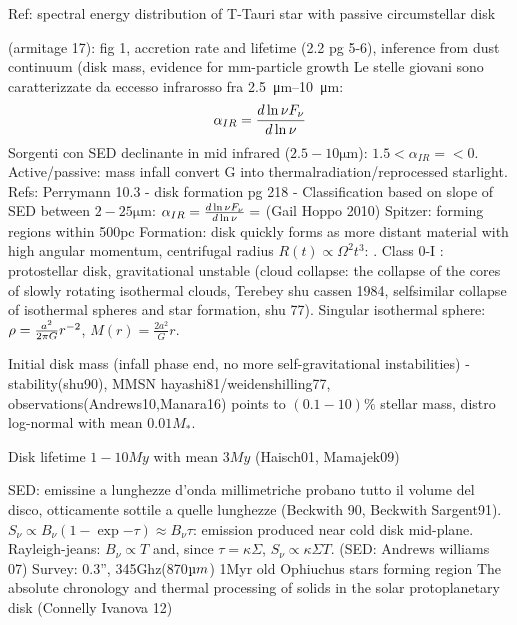 \begin{workout}
	Ref: spectral energy distribution of T-Tauri star with passive circumstellar disk
\end{workout}

\begin{workout}
	(armitage 17): fig 1, accretion rate and lifetime (2.2 pg 5-6), inference from dust continuum (disk mass, evidence for mm-particle growth
	Le stelle giovani sono caratterizzate da eccesso infrarosso fra \SIrange{2.5}{10}{\micro\meter}:
	\begin{equation}
	\alpha_{IR}=\frac{d \ln{\nu F_{\nu}}}{d \ln{\nu}}
	\end{equation}
	Sorgenti con SED declinante in mid infrared ($2.5-10\si{\micro\meter}$): $1.5<\alpha_{IR}=<0$. Active/passive: mass infall convert G into thermalradiation/reprocessed starlight.
	Refs: Perrymann 10.3 - disk formation pg 218 - 
	Classification based on slope of SED between $2-25\si{\micro\meter}$: $\alpha_{IR}=\frac{d \ln{\nu F_{\nu}}}{d \ln{\nu}}=$ (Gail Hoppo 2010)
	Spitzer: forming regions within 500pc
	Formation: disk quickly forms as more distant material with high angular momentum, centrifugal radius $R(t)\propto\Omega^2 t^3$: . Class 0-I : protostellar disk, gravitational unstable (cloud collapse: the collapse of the cores of slowly rotating isothermal clouds, Terebey shu cassen 1984, selfsimilar collapse of isothermal spheres and star formation, shu 77). Singular isothermal sphere: $\rho=\frac{a^2}{2\pi G}r^{-2}$, $M(r)=\frac{2a^2}{G}r$.
\end{workout}

\begin{workout}
	
	Initial disk mass
	(infall phase end, no more self-gravitational instabilities) - stability(shu90), MMSN hayashi81/weidenshilling77, observations(Andrews10,Manara16) points to $(0.1-10)\%$ stellar mass, distro log-normal with mean $0.01M_*$.
	
	{Disk lifetime}
	$1-10My$ with mean $3My$ (Haisch01, Mamajek09)
	
\end{workout}

\begin{workout}
	SED: emissine a lunghezze d'onda millimetriche probano tutto il volume del disco, otticamente sottile a quelle lunghezze (Beckwith 90, Beckwith Sargent91).
	$S_{\nu}\propto B_{\nu}(1-\exp{-\tau})\approx B_{\nu}\tau$: emission produced near cold disk mid-plane.
	Rayleigh-jeans: $B_{\nu}\propto T$ and, since $\tau=\kappa\Sigma$, $S_{\nu}\propto \kappa\Sigma T$.
	(SED: Andrews williams 07)
	Survey: 0.3'', 345Ghz(870$\micro m$) 1Myr old Ophiuchus stars forming region
	The absolute chronology and thermal processing of solids in the solar protoplanetary disk (Connelly Ivanova 12)
\end{workout}

